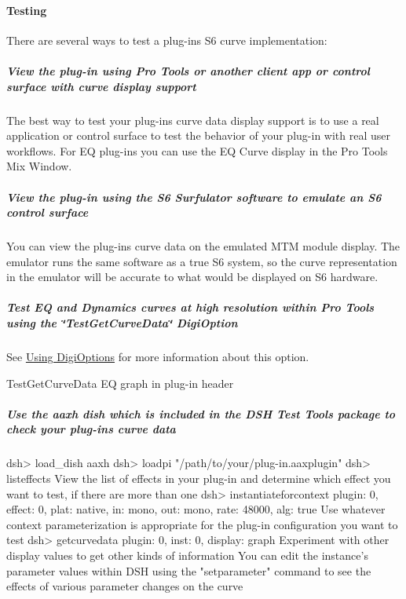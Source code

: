 \paragraph*{Testing}

 There are several ways to test a plug-\/in\textquotesingle{}s S6 curve implementation\+:

 \subparagraph*{View the plug-\/in using Pro Tools or another client app or control surface with curve display support }

  The best way to test your plug-\/in\textquotesingle{}s curve data display support is to use a real application or control surface to test the behavior of your plug-\/in with real user workflows. For E\+Q plug-\/ins you can use the E\+Q Curve display in the Pro Tools Mix Window.

 

 \subparagraph*{View the plug-\/in using the S6 Surfulator software to emulate an S6 control surface }

  You can view the plug-\/in\textquotesingle{}s curve data on the emulated M\+T\+M module display. The emulator runs the same software as a true S6 system, so the curve representation in the emulator will be accurate to what would be displayed on S6 hardware. 

 \subparagraph*{Test E\+Q and Dynamics curves at high resolution within Pro Tools using the \char`\"{}\+Test\+Get\+Curve\+Data\char`\"{} Digi\+Option }

  See \hyperlink{a00360_aax_pro_tools_guide_06c_digioptions}{Using Digi\+Options} for more information about this option.

  Test\+Get\+Curve\+Data E\+Q graph in plug-\/in header 

 \subparagraph*{Use the aaxh dish which is included in the D\+S\+H Test Tools package to check your plug-\/in\textquotesingle{}s curve data }

  \begin{DoxyVerb}dsh> load_dish aaxh
dsh> loadpi "/path/to/your/plug-in.aaxplugin"
dsh> listeffects
	View the list of effects in your plug-in and determine which effect you want to test, if there are more than one
dsh> instantiateforcontext {plugin: 0, effect: 0, plat: native, in: mono, out: mono, rate: 48000, alg: true}
	Use whatever context parameterization is appropriate for the plug-in configuration you want to test
dsh> getcurvedata {plugin: 0, inst: 0, display: graph}
	Experiment with other display values to get other kinds of information
	You can edit the instance's parameter values within DSH using the "setparameter" command to see the effects of various parameter changes on the curve\end{DoxyVerb}


